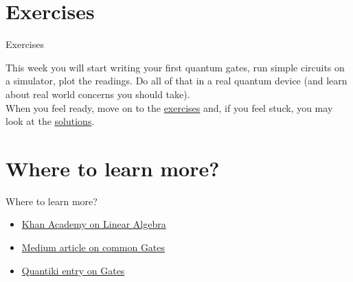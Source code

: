 \documentclass[aspectratio=43]{beamer}
\begin{document}
\section{Exercises}
\begin{frame}{Exercises}
\begin{card}[Hands-on]
    This week you will start writing your first quantum gates, run simple circuits on a simulator, plot the readings. Do all of that in a real quantum device (and learn about real world concerns you should take).\\
    When you feel ready, move on to the \href{\weekThree/exercises/w3_01.ipynb}{exercises} and, if you feel stuck, you may look at the \href{\weekThree/exercises/w3_01_s.ipynb}{solutions}.
\end{card}
\pagenumber
\end{frame}






\section{Where to learn more?}
\begin{frame}{Where to learn more?}
\begin{card}
    \begin{itemize}
    \item \href{https://www.khanacademy.org/math/linear-algebra}{Khan Academy on Linear Algebra}
    \item \href{https://towardsdatascience.com/demystifying-quantum-gates-one-qubit-at-a-time-54404ed80640}{Medium article on common \q Gates}
    \item \href{https://www.quantiki.org/wiki/quantum-gates}{Quantiki entry on \q Gates}
    \end{itemize}
\end{card}
\end{frame}
\end{document}
